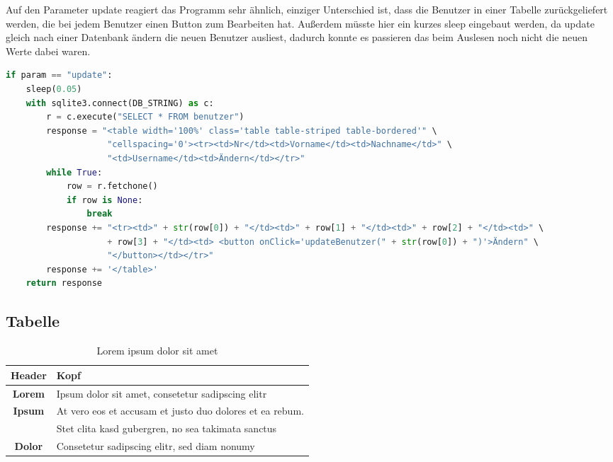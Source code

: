 Auf den Parameter update reagiert das Programm sehr ähnlich, einziger Unterschied ist, dass die Benutzer in einer Tabelle zurückgeliefert werden, die bei jedem Benutzer einen Button zum Bearbeiten hat. Außerdem müsste hier ein kurzes sleep eingebaut werden, da update gleich nach einer Datenbank ändern die neuen Benutzer ausliest, dadurch konnte es passieren das beim Auslesen noch nicht die neuen Werte dabei waren.

\begin{lstlisting}[language=Python, caption=Auslesen aller Benutzer aus der Datenbank und bearbeitbar zurückliefern]
if param == "update":
	sleep(0.05)
	with sqlite3.connect(DB_STRING) as c:
		r = c.execute("SELECT * FROM benutzer")
		response = "<table width='100%' class='table table-striped table-bordered'" \
					"cellspacing='0'><tr><td>Nr</td><td>Vorname</td><td>Nachname</td>" \
					"<td>Username</td><td>Ändern</td></tr>"
		while True:
			row = r.fetchone()
			if row is None:
				break
		response += "<tr><td>" + str(row[0]) + "</td><td>" + row[1] + "</td><td>" + row[2] + "</td><td>" \
					+ row[3] + "</td><td> <button onClick='updateBenutzer(" + str(row[0]) + ")'>Ändern" \
					"</button></td></tr>"
		response += '</table>'
	return response
\end{lstlisting}



\subsection{Tabelle}
\renewcommand{\arraystretch}{1.5}
\begin{table}[!h]
	\center
	\begin{tabular}{ | @{\hspace{3mm}} c @{\hspace{3mm}} | @{\hspace{3mm}} l @{\hspace{3mm}} | }
		\hline Header & Kopf\\ \hline\hline
		\textbf{Lorem} & Ipsum dolor sit amet, consetetur sadipscing elitr\\ \hline
		\textbf{Ipsum} & At vero eos et accusam et justo duo dolores et ea rebum.\\
			& Stet clita kasd gubergren, no sea takimata sanctus\\ \hline
		\textbf{Dolor} & Consetetur sadipscing elitr, sed diam nonumy\\\hline
	\end{tabular}
	\caption{Lorem ipsum dolor sit amet \cite{tanenbaum2007verteilte}}
	\label{methoden}
\end{table}

